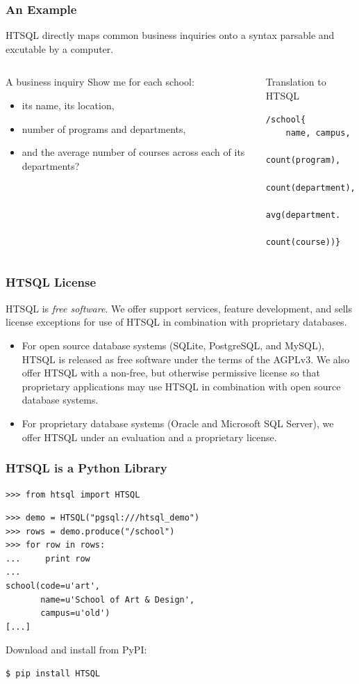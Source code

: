 \documentclass{beamer}
\begin{document}
\begin{frame}[containsverbatim]
\frametitle{An Example}
HTSQL directly maps common business inquiries onto a syntax parsable
and excutable by a computer.
\begin{columns}[c]
\begin{column}[T]{.5\textwidth}
\begin{block}{A business inquiry}
Show me for each school:
\begin{itemize}
\item its name, its location,
\item number of programs and departments,
\item and the average number of courses
      across each of its departments?
\end{itemize}
\end{block}
\end{column}
\begin{column}[T]{.5\textwidth}
\begin{block}{Translation to HTSQL}
\begin{lstlisting}
/school{
    name, campus,
    count(program),
    count(department),
    avg(department.
      count(course))}
\end{lstlisting}
\end{block}
\end{column}
\end{columns}
\end{frame}

\begin{frame}
\frametitle{HTSQL License}
HTSQL is \emph{free software}.  We offer support services, feature development,
and sells license exceptions for use of HTSQL in combination with proprietary
databases.
\begin{itemize}
\item
For open source database systems (SQLite, PostgreSQL, and MySQL), HTSQL is
released as free software under the terms of the AGPLv3. We also offer HTSQL
with a non-free, but otherwise permissive license so that proprietary
applications may use HTSQL in combination with open source database systems.
\item
For proprietary database systems (Oracle and Microsoft SQL Server), we offer
HTSQL under an evaluation and a proprietary license.
\end{itemize}


\end{frame}

\begin{frame}[containsverbatim]
\frametitle{HTSQL is a Python Library}
\begin{block}{\texttt{>>> from htsql import HTSQL}}
\begin{lstlisting}
>>> demo = HTSQL("pgsql:///htsql_demo")
>>> rows = demo.produce("/school")
>>> for row in rows:
...     print row
...
school(code=u'art',
       name=u'School of Art & Design',
       campus=u'old')
[...]
\end{lstlisting}
\end{block}
Download and install from PyPI:
\begin{lstlisting}
$ pip install HTSQL
\end{lstlisting}
\end{frame}
\end{document}
